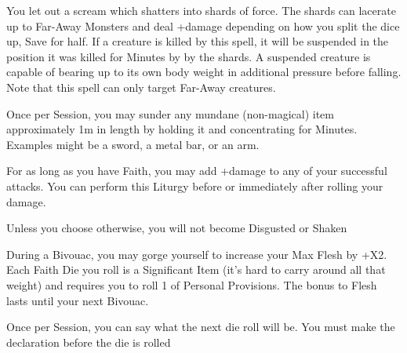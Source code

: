 {You let out a scream which shatters into shards of force.  The shards can lacerate up to \DICE  Far-Away Monsters and deal \SUMDICE+\DICE damage depending on how you split the dice up, Save for half. If a creature is killed by this spell, it will be suspended in the position it was killed for \SUMDICE Minutes by by the shards. A suspended creature is capable of bearing up to its own body weight in additional pressure before falling.  Note that this spell can only target Far-Away creatures.



\GOD[
Name=Set-Utekh,
Link=small-god-set-utekh,
GodOf=Archfiend of Destruction,
Holy=a ceramic circle broken in half and worn on the belt or a necklace
]


Once per Session, you may sunder any mundane (non-magical) item approximately 1m in length by holding it and concentrating for Minutes. Examples might be a sword, a metal bar, or an arm.


For as long as you have Faith, you may add +\DICE damage to any of your successful attacks. You can perform this Liturgy before or immediately after rolling your damage.






\GOD[
Name=The Corpulent One,
Link=small-god-the corpulent one,
GodOf=God of Hunger,
Holy=a necklace of teeth
]


Unless you choose otherwise, you will not become Disgusted or Shaken


During a Bivouac, you may gorge yourself to increase your Max Flesh by +\DICE X2.  Each Faith Die you roll is a Significant Item (it's hard to carry around all that weight) and requires you to roll 1 \UD of Personal Provisions. The bonus to Flesh lasts until your next Bivouac.




\GOD[
Name=The Morrigan,
Link=small-god-the-morrigan,
GodOf=Archon(s) of Fate,
Holy=a triangle whose points extend into counterclockwise swirls usually worn on a headband or scarf
]


Once per Session, you can say what the next die roll will be. You must make the declaration before the die is rolled

}
